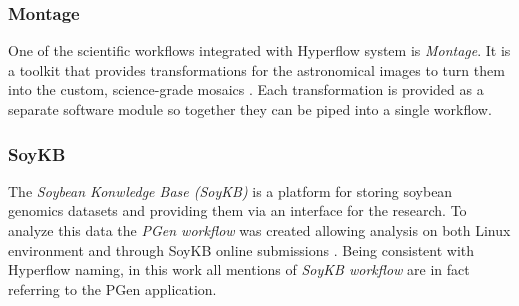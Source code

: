 \subsubsection{Montage}

One of the scientific workflows integrated with Hyperflow system is \emph{Montage}.
It is a toolkit that provides transformations for the astronomical images to turn them into the custom, science-grade mosaics \cite{b:Montage-url}.
Each transformation is provided as a separate software module \cite{b:Montage} so together they can be piped into a single workflow.



\subsubsection{SoyKB}

The \emph{Soybean Konwledge Base (SoyKB)} is a platform for storing soybean genomics datasets and providing them via an interface for the research.
To analyze this data the \emph{PGen workflow} was created allowing analysis on both Linux environment and through SoyKB online submissions \cite{b:SoyKB-workflow-url, b:SoyKB-PGen}.
Being consistent with Hyperflow naming, in this work all mentions of \emph{SoyKB workflow} are in fact referring to the PGen application.


